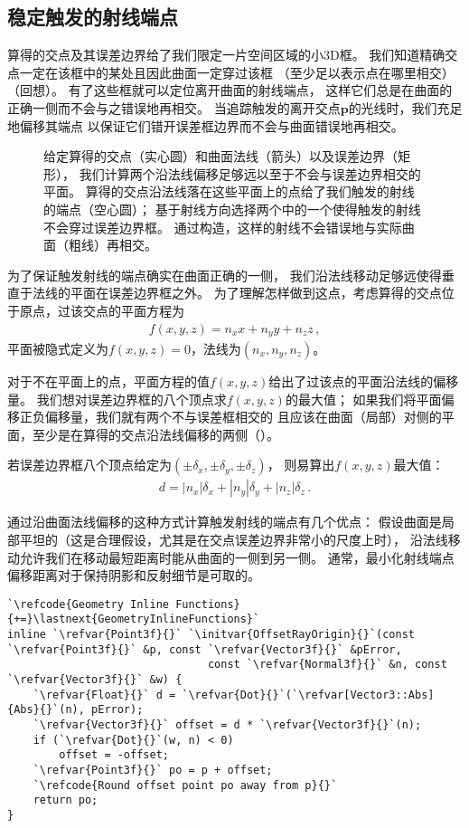 \subsection{稳定触发的射线端点}\label{sub:稳定触发的射线端点}
算得的交点及其误差边界给了我们限定一片空间区域的小3D框。
我们知道精确交点一定在该框中的某处且因此曲面一定穿过该框
（至少足以表示点在哪里相交）（回想）。
有了这些框就可以定位离开曲面的射线端点，
这样它们总是在曲面的正确一侧而不会与之错误地再相交。
当追踪触发的离开交点$\bm p$的光线时，我们充足地偏移其端点
以保证它们错开误差框边界而不会与曲面错误地再相交。
\begin{figure}[htbp]
    \centering
    \caption{给定算得的交点（实心圆）和曲面法线（箭头）以及误差边界（矩形），
        我们计算两个沿法线偏移足够远以至于不会与误差边界相交的平面。
        算得的交点沿法线落在这些平面上的点给了我们触发的射线的端点（空心圆）；
        基于射线方向选择两个中的一个使得触发的射线不会穿过误差边界框。
        通过构造，这样的射线不会错误地与实际曲面（粗线）再相交。}
    \label{fig:3.45}
\end{figure}

为了保证触发射线的端点确实在曲面正确的一侧，
我们沿法线移动足够远使得垂直于法线的平面在误差边界框之外。
为了理解怎样做到这点，考虑算得的交点位于原点，过该交点的平面方程为
\begin{align*}
    f(x,y,z)=n_xx+n_yy+n_zz\, ,
\end{align*}
平面被隐式定义为$f(x,y,z)=0$，法线为$(n_x,n_y,n_z)$。

对于不在平面上的点，平面方程的值$f(x,y,z)$给出了过该点的平面沿法线的偏移量。
我们想对误差边界框的八个顶点求$f(x,y,z)$的最大值；
如果我们将平面偏移正负偏移量，我们就有两个不与误差框相交的
且应该在曲面（局部）对侧的平面，至少是在算得的交点沿法线偏移的两侧（）。

若误差边界框八个顶点给定为$(\pm\delta_x,\pm\delta_y,\pm\delta_z)$，
则易算出$f(x,y,z)$最大值：
\begin{align*}
    d=|n_x|\delta_x+|n_y|\delta_y+|n_z|\delta_z\, .
\end{align*}

通过沿曲面法线偏移的这种方式计算触发射线的端点有几个优点：
假设曲面是局部平坦的（这是合理假设，尤其是在交点误差边界非常小的尺度上时），
沿法线移动允许我们在移动最短距离时能从曲面的一侧到另一侧。
通常，最小化射线端点偏移距离对于保持阴影和反射细节是可取的。
\begin{lstlisting}
`\refcode{Geometry Inline Functions}{+=}\lastnext{GeometryInlineFunctions}`
inline `\refvar{Point3f}{}` `\initvar{OffsetRayOrigin}{}`(const `\refvar{Point3f}{}` &p, const `\refvar{Vector3f}{}` &pError,
                               const `\refvar{Normal3f}{}` &n, const `\refvar{Vector3f}{}` &w) {
    `\refvar{Float}{}` d = `\refvar{Dot}{}`(`\refvar[Vector3::Abs]{Abs}{}`(n), pError);
    `\refvar{Vector3f}{}` offset = d * `\refvar{Vector3f}{}`(n);
    if (`\refvar{Dot}{}`(w, n) < 0)
        offset = -offset;
    `\refvar{Point3f}{}` po = p + offset;
    `\refcode{Round offset point po away from p}{}`
    return po;
}
\end{lstlisting}

